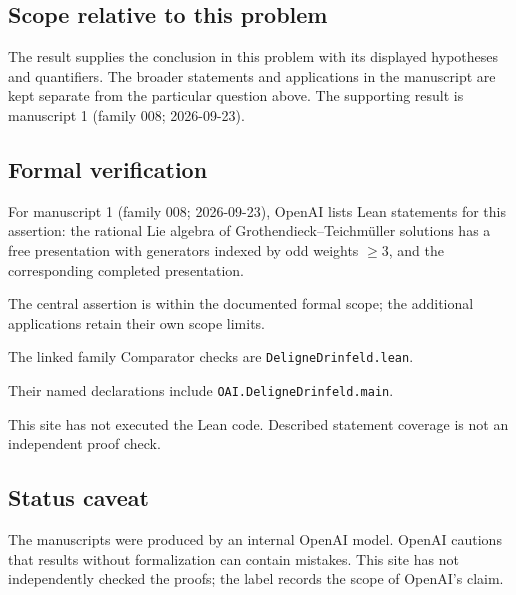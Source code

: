\documentclass[11pt]{article}
\begin{document}
\subsection{Scope relative to this problem}
The result supplies the conclusion in this problem with its displayed hypotheses and quantifiers. The broader statements and applications in the manuscript are kept separate from the particular question above. The supporting result is manuscript 1 (family 008; 2026-09-23).

\subsection{Formal verification}
For manuscript 1 (family 008; 2026-09-23), OpenAI lists Lean statements for this assertion: the rational Lie algebra of Grothendieck--Teichm\"uller solutions has a free presentation with generators indexed by odd weights $\ge3$, and the corresponding completed presentation.

The central assertion is within the documented formal scope; the additional applications retain their own scope limits.

The linked family Comparator checks are \texttt{DeligneDrinfeld.lean}.

Their named declarations include \texttt{OAI.DeligneDrinfeld.main}.

This site has not executed the Lean code. Described statement coverage is not an independent proof check.

\subsection{Status caveat}
The manuscripts were produced by an internal OpenAI model. OpenAI cautions that results without formalization can contain mistakes. This site has not independently checked the proofs; the label records the scope of OpenAI's claim.
\end{document}
